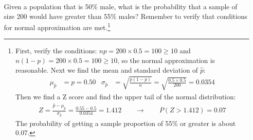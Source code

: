 \begin{exercise}Given a population that is 50\% male, what is the probability that a sample of size 200 would have greater than 55\% males?  Remember to verify that conditions for normal approximation are met.\footnote{First, verify the conditions: $np = 200 \times 0.5 = 100 \ge 10$ and $n(1-p) = 200 \times 0.5 = 100 \ge 10$, so the normal approximation is reasonable. Next we find the mean and standard deviation of $\hat{p}$:
\begin{align*}
\mu_{\hat{p}} &= p = 0.50
	& \sigma_{\hat{p}} &= \sqrt{\frac{p(1-p)}{n}}
		= \sqrt{\frac{0.5 \times 0.5}{200}}
		= 0.0354
\end{align*}
Then we find a Z score and find the upper tail of the normal distribution:
\begin{align*}
Z = \frac{\hat{p} - \mu_{\hat{p}}}{\sigma_{\hat{p}}} = \frac{0.55 - 0.5}{0.0354} = 1.412
\qquad \rightarrow \qquad
P(Z > 1.412) = 0.07
\end{align*}
The probability of getting a sample proportion of 55\% or greater is about 0.07.}
\end{exercise}

